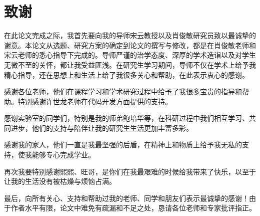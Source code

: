 

\chapter*{致\quad 谢}

在此论文完成之际，我首先要向我的导师宋云教授以及肖俊敏研究员致以最诚挚的谢意。本论文从选题、研究方案的确定到论文的撰写与修改，都是在肖俊敏老师和宋云老师的悉心指导下完成的。导师严谨的治学态度、深厚的学术造诣以及对学生无微不至的关怀，都让我受益匪浅。在研究生学习期间，导师不仅在学术上给予我精心指导，还在思想上和生活上给了我很多关心和帮助，在此表示衷心的感谢。

感谢各位老师，他们在课程学习和学术研究过程中给予了我很多宝贵的指导和帮助。特别感谢许世龙老师在代码开发方面提供的支持。

感谢实验室的同学们，特别是我的师弟鲍培华等，在科研过程中我们相互学习、共同进步，他们的支持与陪伴让我的研究生生活更加丰富多彩。

感谢我的家人，他们一直是我最坚强的后盾，在精神上和物质上给予我无私的支持，使我能够专心完成学业。

再次我要特别感谢熙熙、旺哥，是你们在我最艰难的时候给我带来了快乐，以至于让我的生活没有被枯燥与烦恼占满。

最后，向所有关心、支持和帮助过我的老师、同学和朋友们表示最诚挚的感谢！由于作者水平有限，论文中难免有疏漏和不足之处，恳请各位老师和专家批评指正。















